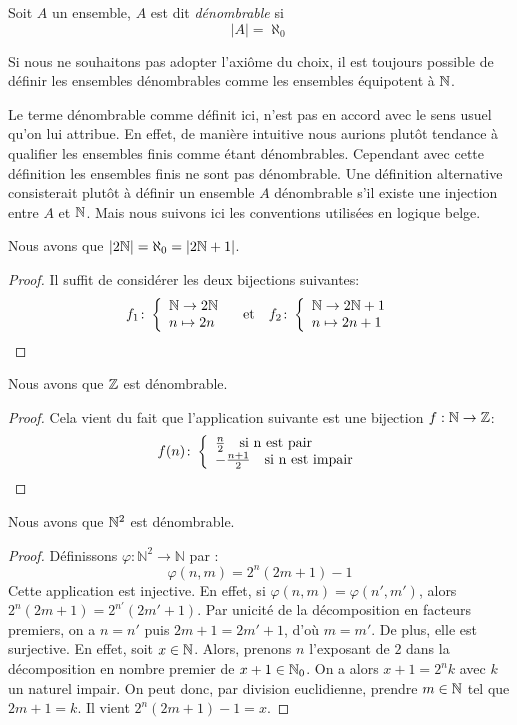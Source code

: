 \begin{definition}
    Soit $A$ un ensemble, $A$ est dit \emph{dénombrable} si
    \[
    |A|= \aleph_0
    \]
\end{definition}

\begin{remarque}
    Si nous ne souhaitons pas adopter l'axiôme du choix, il est toujours possible de définir les ensembles dénombrables comme les ensembles équipotent à $\mathbb{N}$. 
\end{remarque}

\begin{remarque}
    Le terme dénombrable comme définit ici, n'est pas en accord avec le sens usuel qu'on lui attribue. En effet, de manière intuitive nous aurions plutôt tendance à qualifier les ensembles finis comme étant dénombrables. Cependant avec cette définition les ensembles finis ne sont pas dénombrable. Une définition alternative consisterait plutôt à définir un ensemble $A$ dénombrable s'il existe une injection entre $A$ et $\mathbb{N}$. Mais nous suivons ici les conventions utilisées en logique belge. 
\end{remarque}

\begin{proposition}
    Nous avons que $|2\mathbb{N}|= \aleph_0 = |2\mathbb{N} +1|$.
\end{proposition}

\begin{proof}
Il suffit de considérer les deux bijections suivantes:
$$f_1\colon \left\{\begin{array}{l}\mathbb{N}\to 2\mathbb{N} \\n\mapsto2n\end{array}\right. \quad \text{et}\quad f_2\colon \left\{\begin{array}{l}\mathbb{N} \to 2\mathbb{N} +1 \\n\mapsto 2n+1\end{array}\right.$$

\end{proof}

\begin{proposition}
    Nous avons que $\mathbb{Z}$ est dénombrable.
\end{proposition}

\begin{proof}
Cela vient du fait que l'application suivante est une bijection $f:\mathbb{N}\to \mathbb{Z}$:
\[
f(n)\colon \left\{\begin{array}{l}\frac{n}{2} \quad \text{si n est pair} \\-\frac{n+1}{2} \quad \text{si n est impair}\end{array}\right.
\]
\end{proof}

\begin{proposition}
    Nous avons que $\mathbb{N}^2$ est dénombrable.
\end{proposition}

\begin{proof}
Définissons $\varphi : \mathbb{N}^2 \to \mathbb{N}$ par :
\[
\varphi(n,m) = 2^n(2m+1) -1
\]
Cette application est injective. En effet, si $\varphi(n,m) = \varphi(n',m')$, alors $2^n(2m+1) = 2^{n'}(2m'+1)$. Par unicité de la décomposition en facteurs premiers, on a $n = n'$ puis $2m+1 = 2m'+1$, d'où $m = m'$.
De plus, elle est surjective. En effet, soit $x\in\mathbb{N}$. Alors, prenons $n$ l'exposant de $2$ dans la décomposition en nombre premier de $x+1\in\mathbb{N}_0$. On a alors $x+1 = 2^nk$ avec $k$ un naturel impair. On peut donc, par division euclidienne, prendre $m\in\mathbb{N}$ tel que $2m+1 = k$. Il vient $2^n(2m+1)-1 = x$. 
\end{proof}

